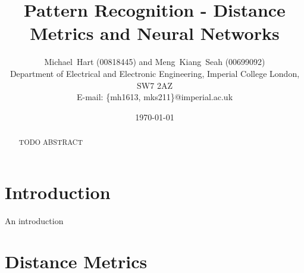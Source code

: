\documentclass[a4paper, 10pt, conference]{ieeeconf}
\begin{document}
\title{Pattern Recognition - Distance Metrics and Neural Networks}
\author{Michael~Hart (00818445) and
        Meng~Kiang~Seah (00699092)
\\
        Department of Electrical and Electronic Engineering, 
        Imperial College London, 
        SW7 2AZ
\\        
        E-mail: \{mh1613, mks211\}@imperial.ac.uk}
\date{\today}




\maketitle


\begin{abstract}
TODO ABSTRACT
\end{abstract}

\section{Introduction}

An introduction

\section{Distance Metrics}

\end{document}
